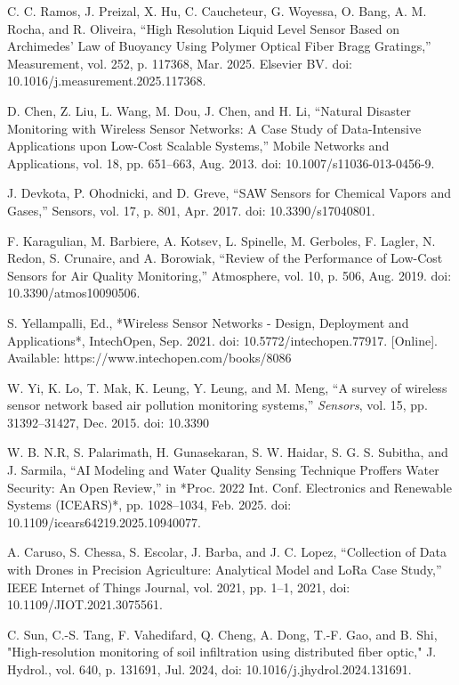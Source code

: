 \documentclass[conference]{IEEEtran}
\begin{document}
\begin{thebibliography}{00}
 C. C. Ramos, J. Preizal, X. Hu, C. Caucheteur, G. Woyessa, O. Bang, A. M. Rocha, and R. Oliveira, 
``High Resolution Liquid Level Sensor Based on Archimedes’ Law of Buoyancy Using Polymer Optical Fiber Bragg Gratings,'' 
Measurement, vol. 252, p. 117368, Mar. 2025. Elsevier BV. doi: 10.1016/j.measurement.2025.117368.

 D. Chen, Z. Liu, L. Wang, M. Dou, J. Chen, and H. Li, 
``Natural Disaster Monitoring with Wireless Sensor Networks: A Case Study of Data-Intensive Applications upon Low-Cost Scalable Systems,'' 
Mobile Networks and Applications, vol. 18, pp. 651--663, Aug. 2013. doi: 10.1007/s11036-013-0456-9.

 J. Devkota, P. Ohodnicki, and D. Greve, 
``SAW Sensors for Chemical Vapors and Gases,'' 
Sensors, vol. 17, p. 801, Apr. 2017. 
doi: 10.3390/s17040801.

 F. Karagulian, M. Barbiere, A. Kotsev, L. Spinelle, M. Gerboles, F. Lagler, N. Redon, S. Crunaire, and A. Borowiak, 
``Review of the Performance of Low-Cost Sensors for Air Quality Monitoring,'' 
Atmosphere, vol. 10, p. 506, Aug. 2019. doi: 10.3390/atmos10090506.

 S. Yellampalli, Ed., 
*Wireless Sensor Networks - Design, Deployment and Applications*, IntechOpen, Sep. 2021. doi: 10.5772/intechopen.77917. [Online]. Available: https://www.intechopen.com/books/8086

 W. Yi, K. Lo, T. Mak, K. Leung, Y. Leung, and M. Meng, ``A survey of wireless sensor network based air pollution monitoring systems,'' \emph{Sensors}, vol. 15, pp. 31392--31427, Dec. 2015. doi: 10.3390

 W. B. N.R, S. Palarimath, H. Gunasekaran, S. W. Haidar, S. G. S. Subitha, and J. Sarmila, 
``AI Modeling and Water Quality Sensing Technique Proffers Water Security: An Open Review,'' 
in *Proc. 2022 Int. Conf. Electronics and Renewable Systems (ICEARS)*, pp. 1028--1034, Feb. 2025. doi: 10.1109/icears64219.2025.10940077.

 A. Caruso, S. Chessa, S. Escolar, J. Barba, and J. C. Lopez, “Collection of Data with Drones in Precision Agriculture: Analytical Model and LoRa Case Study,” IEEE Internet of Things Journal, vol. 2021, pp. 1–1, 2021, doi: 10.1109/JIOT.2021.3075561.

 C. Sun, C.-S. Tang, F. Vahedifard, Q. Cheng, A. Dong, T.-F. Gao, and B. Shi, "High-resolution monitoring of soil infiltration using distributed fiber optic," J. Hydrol., vol. 640, p. 131691, Jul. 2024, doi: 10.1016/j.jhydrol.2024.131691.
 

\end{thebibliography}
\end{document}
